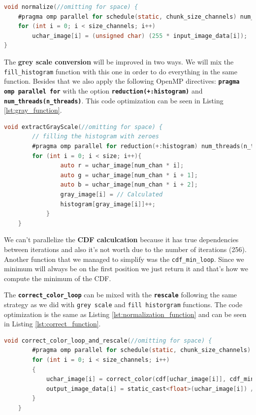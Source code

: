 \documentclass[sigconf]{acmart}
\begin{document}
\begin{lstlisting}[language=C, caption=Normalization Function, label={lst:normalization_function}]
void normalize(//omitting for space) {
    #pragma omp parallel for schedule(static, chunk_size_channels) num_threads(n_threads)
    for (int i = 0; i < size_channels; i++)
        uchar_image[i] = (unsigned char) (255 * input_image_data[i]);
}
\end{lstlisting}
The \textbf{grey scale conversion} will be improved in two ways. We will mix the \texttt{fill\_histogram}
function with this one in order to do everything in the same function. Besides that we also apply the following OpenMP directives: \texttt{\textbf{pragma omp parallel for}}
with the option \texttt{\textbf{reduction(+:histogram)}} and \texttt{\textbf{num\_threads(n\_threads)}}. This code optimization can be seen in Listing \ref{lst:gray_function}.
\begin{lstlisting}[language=C, caption=Grey Conversion Function, label={lst:gray_function}]
	void extractGrayScale(//omitting for space) {
       	// filling the histogram with zeroes
        #pragma omp parallel for reduction(+:histogram) num_threads(n_threads)
        for (int i = 0; i < size; i++){
                auto r = uchar_image[num_chan * i];
                auto g = uchar_image[num_chan * i + 1];
                auto b = uchar_image[num_chan * i + 2];
                gray_image[i] = // Calculated
                histogram[gray_image[i]]++;
            }
    }
\end{lstlisting}
We can't parallelize the \textbf{CDF calculcation} because it has true dependencies between iterations and also it's not worth due to the number of iterations (256).
Another function that we managed to simplify was the \texttt{cdf\_min\_loop}. Since we minimum will always be on the first position we just return it and that's how we compute
the minimum of the CDF.

The \texttt{\textbf{correct\_color\_loop}} can be mixed with the \texttt{\textbf{rescale}} following the same strategy as we did with \texttt{grey scale} and \texttt{fill historgram} functions. The code optimization is the same as Listing \ref{lst:normalization_function} and can be seen in Listing \ref{lst:correct_function}.
\begin{lstlisting}[language=C, caption=Color Correction Function, label={lst:correct_function}]
	void correct_color_loop_and_rescale(//omitting for space) {
        #pragma omp parallel for schedule(static, chunk_size_channels) num_threads(n_threads)
        for (int i = 0; i < size_channels; i++)
        {
            uchar_image[i] = correct_color(cdf[uchar_image[i]], cdf_min);
            output_image_data[i] = static_cast<float>(uchar_image[i]) / 255.0f;
        }
    }
\end{lstlisting}
\end{document}
